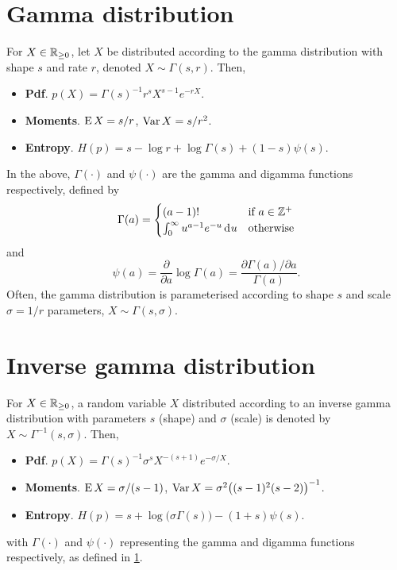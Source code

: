 \section{Gamma distribution}
\label{apx:gammadist}
\vspace{-0.2em}

\begin{definition}
  For $X\in\mathbb{R}_{\geq 0}$, let $X$ be distributed according to the gamma distribution with shape $s$ and rate $r$, denoted $X\sim\Gamma(s,r)$. 
  Then,
  \begin{itemize}
    \item \textbf{Pdf}. $p(X) = \Gamma(s)^{-1} r^s X^{s-1} e^{-rX}$.
    \item \textbf{Moments}. $\operatorname{E} X=s/r$, $\operatorname{Var} X = s/r^2$.
    \item \textbf{Entropy}. $H(p)=s - \log r + \log \Gamma(s) + (1-s)\psi(s)$.
  \end{itemize}
\end{definition}

In the above, $\Gamma(\cdot)$ and $\psi(\cdot)$ are the gamma and digamma functions respectively, defined by
\[
  \Gamma(a) = 
  \begin{cases}
    (a-1)! &\text{if } a \in \mathbb{Z}^+ \\
    \int_0^\infty u^{a-1} e^{-u} \operatorname{d}\hspace{0.5pt}\! u &\text{otherwise} \\
  \end{cases}
\]
and
\[
  \psi(a) = \frac{\partial}{\partial a}\log \Gamma(a) = \frac{\partial\Gamma(a)/\partial a}{\Gamma(a)}.
\]
Often, the gamma distribution is parameterised according to shape $s$ and scale $\sigma = 1/r$ parameters, $X\sim\Gamma(s,\sigma)$.
\vspace{-0.5em}

\section{Inverse gamma distribution}
\label{def:invgam}
\vspace{-0.2em}

\begin{definition}
  For $X\in\mathbb{R}_{\geq 0}$, a random variable $X$ distributed according to an inverse gamma distribution with parameters $s$ (shape) and $\sigma$ (scale) is denoted by $X\sim\Gamma^{-1}(s,\sigma)$.
  Then,
  \begin{itemize}
    \item \textbf{Pdf}. $p(X) = \Gamma(s)^{-1} \sigma^s  X^{-(s+1)} e^{-\sigma/X}$.
    \item \textbf{Moments}. $\operatorname{E} X=\sigma/(s-1)$, $\operatorname{Var} X = \sigma^2\big((s-1)^2(s-2) \big)^{-1}$.
    \item \textbf{Entropy}. $H(p)= s + \log \big(\sigma\Gamma(s)\big) - (1+s)\psi(s)$.
  \end{itemize}
  with $\Gamma(\cdot)$ and $\psi(\cdot)$ representing the gamma and digamma functions respectively, as defined in \cref{apx:gammadist}.
\end{definition}

